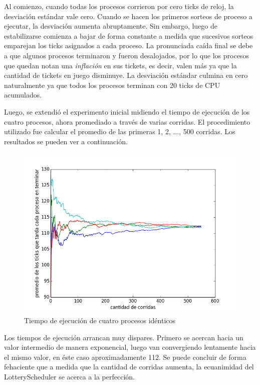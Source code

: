 \documentclass[11pt, a4paper, twoside]{article}
\begin{document}
Al comienzo, cuando todas los procesos corrieron por cero ticks de reloj, la desviación estándar vale cero. Cuando se hacen los primeros sorteos de proceso a ejecutar, la desviación aumenta abruptamente. Sin embargo, luego de estabilizarse comienza a bajar de forma constante a medida que sucesivos sorteos emparejan los ticks asignados a cada proceso. La pronunciada caída final se debe a que algunos procesos terminaron y fueron desalojados, por lo que los procesos que quedan notan una \textit{inflación} en sus tickets, es decir, valen más ya que la cantidad de tickets en juego disminuye. La desviación estándar culmina en cero naturalmente ya que todos los procesos terminan con 20 ticks de CPU acumulados.

Luego, se extendió el experimento inicial midiendo el tiempo de ejecución de los cuatro procesos, ahora promediado a través de varias corridas. El procedimiento utilizado fue calcular el promedio de las primeras 1, 2, ..., 500 corridas. Los resultados se pueden ver a continuación.

\begin{figure}[H]
\centering
\includegraphics[width=\textwidth]{../experimentacion/ej9-fairness/tiempo_final/prueba-tiempo-final.png}
\caption{Tiempo de ejecución de cuatro procesos idénticos}
\end{figure}


Los tiempos de ejecución arrancan muy dispares. Primero se acercan hacia un valor intermedio de manera exponencial, luego van convergiendo lentamente hacia el mismo valor, en éste caso aproximadamente 112. Se puede concluir de forma fehaciente que a medida que la cantidad de corridas aumenta, la ecuanimidad del LotteryScheduler se acerca a la perfección.
\end{document}
